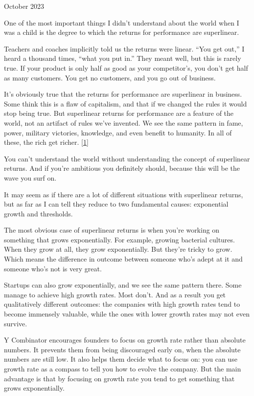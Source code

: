 October 2023

One of the most important things I didn't understand about the world
when I was a child is the degree to which the returns for performance
are superlinear.

Teachers and coaches implicitly told us the returns were linear. ``You
get out,'' I heard a thousand times, ``what you put in.'' They meant
well, but this is rarely true. If your product is only half as good as
your competitor's, you don't get half as many customers. You get no
customers, and you go out of business.

It's obviously true that the returns for performance are superlinear in
business. Some think this is a flaw of capitalism, and that if we
changed the rules it would stop being true. But superlinear returns for
performance are a feature of the world, not an artifact of rules we've
invented. We see the same pattern in fame, power, military victories,
knowledge, and even benefit to humanity. In all of these, the rich get
richer. {[}\hyperref[f1n]{1}{]}

You can't understand the world without understanding the concept of
superlinear returns. And if you're ambitious you definitely should,
because this will be the wave you surf on.

It may seem as if there are a lot of different situations with
superlinear returns, but as far as I can tell they reduce to two
fundamental causes: exponential growth and thresholds.

The most obvious case of superlinear returns is when you're working on
something that grows exponentially. For example, growing bacterial
cultures. When they grow at all, they grow exponentially. But they're
tricky to grow. Which means the difference in outcome between someone
who's adept at it and someone who's not is very great.

Startups can also grow exponentially, and we see the same pattern there.
Some manage to achieve high growth rates. Most don't. And as a result
you get qualitatively different outcomes: the companies with high growth
rates tend to become immensely valuable, while the ones with lower
growth rates may not even survive.

Y Combinator encourages founders to focus on growth rate rather than
absolute numbers. It prevents them from being discouraged early on, when
the absolute numbers are still low. It also helps them decide what to
focus on: you can use growth rate as a compass to tell you how to evolve
the company. But the main advantage is that by focusing on growth rate
you tend to get something that grows exponentially.

